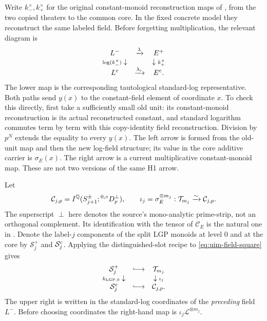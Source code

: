 Write \(k_-^\times,k_+^\times\) for the
original constant-monoid reconstruction
maps of
\cite[Corollary~4.6(iii)]{IUT2}, from the
two copied theaters to the common core.
In the fixed concrete model they reconstruct
the same labeled field. Before forgetting
multiplication, the relevant diagram is
\begin{equation}\label{eq:uim-field-square}
 \begin{array}{ccc}
 L^-&\xrightarrow{\lambda}&E^+\\
 {\scriptstyle\log(k_-^\times)}\downarrow
       &&\downarrow{\scriptstyle k_+^\times}\\
 L^{\rm c}&\xrightarrow{\lambda_{\rm c}}&E^{\rm c}.
 \end{array}
\end{equation}
The lower map is the corresponding tautological
standard-log representative.
Both paths send \(y(x)\) to the constant-field
element of coordinate \(x\). To check this directly,
first take a sufficiently small old unit:
its constant-monoid reconstruction is its
actual reconstructed constant, and standard
logarithm commutes term by term with this
copy-identity field reconstruction.
Division by \(p^N\) extends the equality to
every \(y(x)\). The left arrow is formed from
the old-unit map and then the new log-field
structure; its value in the core additive
carrier is \(\sigma_E(x)\).
The right arrow is a current multiplicative
constant-monoid map. These are not two
versions of the same H1 arrow.

Let
\[
 \mathcal C_{j,p}
   =I^\mathbb Q(S^\pm_{j+1};{}^{0,\circ}D^\perp_p),
 \qquad
 \iota_j=\sigma_E^{\otimes m_j}:
           \mathcal T_{m_j}\xrightarrow{\sim}\mathcal C_{j,p}.
\]
The superscript \(\perp\) here denotes the
source's mono-analytic prime-strip, not an
orthogonal complement. Its identification with
the tensor of \(\mathcal C_E\) is the natural
one in \cite[Proposition~3.2(i),(ii), pp.~97--99]{IUT3}.
Denote the label-\(j\) components of the
split LGP monoids at level \(0\) and at the
core by \(\mathcal S_j^+\) and
\(\mathcal S_j^{\rm c}\). Applying the
distinguished-slot recipe to
\eqref{eq:uim-field-square} gives
\begin{equation}\label{eq:uim-packet-square}
 \begin{array}{ccc}
 \mathcal S_j^+&\lhook\joinrel\longrightarrow&
                                    \mathcal T_{m_j}\\
 {\scriptstyle k_{{\rm LGP},0}}\downarrow
       &&\downarrow{\scriptstyle\iota_j}\\
 \mathcal S_j^{\rm c}&\lhook\joinrel\longrightarrow&
                                    \mathcal C_{j,p}.
 \end{array}
\end{equation}
The upper right is written in the standard-log
coordinates of the \emph{preceding} field \(L^-\).
Before choosing coordinates the right-hand map
is \(\iota_j\mathcal L^{\otimes m_j}\).

